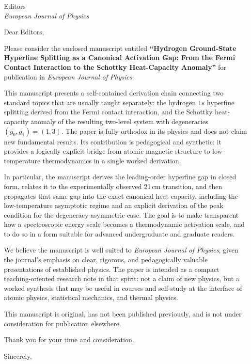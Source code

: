 \documentclass[a4paper,10pt]{letter}
\date{\today}
\begin{document}
    
    \begin{letter}{Editors\\
    \textit{European Journal of Physics}}
        
        \opening{Dear Editors,}
        
        Please consider the enclosed manuscript entitled
        \textbf{“Hydrogen Ground-State Hyperfine Splitting as a Canonical Activation Gap: From the Fermi Contact Interaction to the Schottky Heat-Capacity Anomaly”}
        for publication in \textit{European Journal of Physics}.
        
        This manuscript presents a self-contained derivation chain connecting two standard topics that are usually taught separately: the hydrogen $1s$ hyperfine splitting derived from the Fermi contact interaction, and the Schottky heat-capacity anomaly of the resulting two-level system with degeneracies $(g_0,g_1)=(1,3)$. The paper is fully orthodox in its physics and does not claim new fundamental results. Its contribution is pedagogical and synthetic: it provides a logically explicit bridge from atomic magnetic structure to low-temperature thermodynamics in a single worked derivation.
        
        In particular, the manuscript derives the leading-order hyperfine gap in closed form, relates it to the experimentally observed 21\,cm transition, and then propagates that same gap into the exact canonical heat capacity, including the low-temperature asymptotic regime and an explicit derivation of the peak condition for the degeneracy-asymmetric case. The goal is to make transparent how a spectroscopic energy scale becomes a thermodynamic activation scale, and to do so in a form suitable for advanced undergraduate and graduate readers.
        
        We believe the manuscript is well suited to \textit{European Journal of Physics}, given the journal’s emphasis on clear, rigorous, and pedagogically valuable presentations of established physics. The paper is intended as a compact teaching-oriented research note in that spirit: not a claim of new physics, but a worked synthesis that may be useful in courses and self-study at the interface of atomic physics, statistical mechanics, and thermal physics.
        
        This manuscript is original, has not been published previously, and is not under consideration for publication elsewhere.
        
        Thank you for your time and consideration.
        
        \closing{Sincerely,}
    
    \end{letter}
\end{document}
